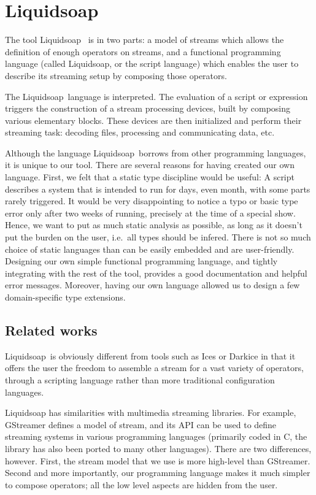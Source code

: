 \documentclass{llncs}
\newcommand{\liquidsoap}{Liquidsoap}
\newcommand{\ie}{{i.e.}}
\begin{document}
\section{\liquidsoap}

The tool \liquidsoap\ \cite{liquidsoap} is in two parts:
  a model of streams which allows the definition of enough
  operators on streams, and a functional programming language
  (called \liquidsoap, or the script language) which enables
  the user to describe its streaming setup by composing those operators.

The \liquidsoap\ language is interpreted.
The evaluation of a script or expression triggers the construction
of a stream processing devices, built by composing various elementary
blocks.
These devices are then initialized and perform their streaming task:
decoding files, processing and communicating data, etc.


Although the language \liquidsoap\ borrows from other programming
languages, it is unique to our tool.
There are several reasons for having created our own language.
First, we felt that a static type discipline would be useful:
A script describes a system that is intended to run for days,
even month, with some parts rarely triggered.
It would be very disappointing to notice a typo or basic type
error only after two weeks of running, precisely at the time
of a special show.
Hence, we want to put as much static analysis as possible,
as long as it doesn't put the burden on the user,
\ie\ all types should be infered.
There is not so much choice of static languages than can be
easily embedded and are user-friendly.
Designing our own simple functional programming language,
and tightly integrating with the rest of the tool,
provides a good documentation and helpful error messages.
Moreover, having our own language allowed us to design
a few domain-specific type extensions.

\subsection{Related works}

\liquidsoap\ is obviously different from tools such as Ices or Darkice in
that it offers the user the freedom to assemble a stream
for a vast variety of operators, through a scripting
language rather than more traditional configuration languages.

Liquidsoap has similarities with multimedia streaming libraries.
For example, GStreamer defines a model of stream, and its API
can be used to define streaming systems in various programming
languages (primarily coded in C, the library has also been
ported to many other languages).
There are two differences, however.
First, the stream model that we use is more high-level than
GStreamer. %
Second and more importantly,
our programming language makes it much simpler
to compose operators; all the low level aspects are hidden
from the user.
\end{document}
